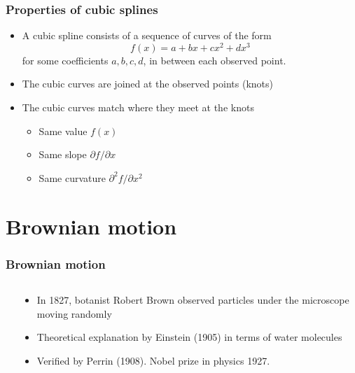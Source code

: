 \documentclass{beamer}
\begin{document}
\begin{frame}
  \frametitle{Properties of cubic splines}

  \begin{itemize}
  \item A cubic spline consists of a sequence of curves of the form
    \[
    f(x) = a + b x + c x^2 + d x^3
    \]
    for some coefficients $a, b, c, d$, in between each observed point.
  \item The cubic curves are joined at the observed points (knots)
  \item The cubic curves match where they meet at the knots
    \begin{itemize}
    \item Same value $f(x)$
    \item Same slope $\partial f/ \partial x$
    \item Same curvature $\partial^2 f / \partial x^2$
    \end{itemize}
  \end{itemize}

\end{frame}

\section{Brownian motion}

\begin{frame}
  \frametitle{Brownian motion}

  \begin{columns}
    \begin{column}{5cm}
    \end{column}
    \begin{column}{5cm}
      \begin{itemize}
        \item In 1827, botanist Robert Brown observed particles under
          the microscope moving randomly
        \item Theoretical explanation by Einstein (1905) in terms of
          water molecules
        \item Verified by Perrin (1908). Nobel prize in physics 1927.
      \end{itemize}
    \end{column}
    \end{columns}

\end{frame}
\end{document}
